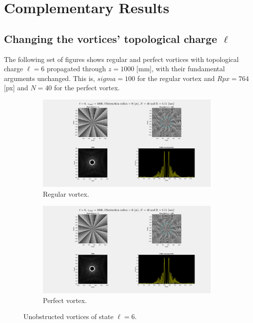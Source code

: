 \chapter{Complementary Results}
\label{Complementary_Results}

\section{Changing the vortices' topological charge $\ell$}

The following set of figures shows regular and perfect vortices with topological charge $\ell = 6$ propagated through $z = 1000$ [mm], with their fundamental arguments unchanged. This is, $sigma = 100$ for the regular vortex and $Rpx = 764$ [px] and $N = 40$ for the perfect vortex.

\begin{figure}[htbp]
    \centering
    \begin{subfigure}[b]{0.45\textwidth}
        \centering
        \includegraphics[width=\textwidth]{images/Appendices/Additional_Results/Topological_Charge/per_6_r0.png}
        \caption{Regular vortex.}
    \end{subfigure}
    \hfill
    \begin{subfigure}[b]{0.45\textwidth}
        \centering
        \includegraphics[width=\textwidth]{images/Appendices/Additional_Results/Topological_Charge/per_6_r0.png}
        \caption{Perfect vortex.}
    \end{subfigure}
    \caption{Unobstructed vortices of state $\ell = 6$.}
    \label{fig:Vortices_L=6_r=0}
\end{figure}

